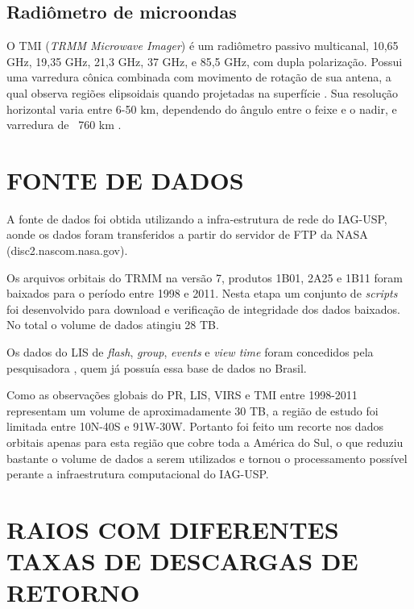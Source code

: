 \subsection{Radiômetro de microondas}

O TMI (\textit{TRMM Microwave Imager}) é um radiômetro passivo multicanal, 10,65 GHz, 19,35 GHz, 21,3 GHz, 37 GHz, e 85,5 GHz, com dupla polarização. Possui uma varredura cônica combinada com movimento de rotação de sua antena, a qual observa regiões elipsoidais quando projetadas na superfície \cite{kummerok1998}. Sua resolução horizontal varia entre 6-50 km, dependendo do ângulo entre o feixe e o nadir, e varredura de ~760 km \cite{trmmhandbook}. 

\section{FONTE DE DADOS}

A fonte de dados foi obtida utilizando a infra-estrutura de rede do IAG-USP, aonde os dados foram transferidos a partir do servidor de FTP da NASA (disc2.nascom.nasa.gov).

Os arquivos orbitais do TRMM na versão 7, produtos 1B01, 2A25 e 1B11 foram baixados para o período entre 1998 e 2011. Nesta etapa um conjunto de \textit{scripts} foi desenvolvido para download e verificação de integridade dos dados baixados. No total o volume de dados atingiu 28 TB.  %

Os dados do LIS de \textit{flash}, \textit{group}, \textit{events} e \textit{view time} foram concedidos pela pesquisadora , quem já possuía essa base de dados no Brasil. 

Como as observações globais do PR, LIS, VIRS e TMI entre 1998-2011 representam um volume de aproximadamente 30 TB, a região de estudo foi limitada entre 10N-40S e 91W-30W. Portanto foi feito um recorte nos dados orbitais apenas para esta região que cobre toda a América do Sul, o que reduziu bastante o volume de dados a serem utilizados e tornou o processamento possível perante a infraestrutura computacional do IAG-USP.

\section{RAIOS COM DIFERENTES TAXAS DE DESCARGAS DE RETORNO}

